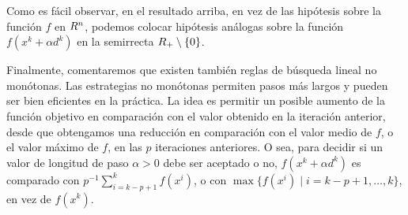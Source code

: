 Como es fácil observar, en el resultado arriba, en vez de las hipótesis sobre la función $f$ en $R^n$, podemos colocar hipótesis análogas sobre la función $f(x^k + \alpha d^k)$ en la semirrecta $R_+ \setminus \{0\}$.

Finalmente, comentaremos que existen también reglas de búsqueda lineal no monótonas. Las estrategias no monótonas permiten pasos más largos y pueden ser bien eficientes en la práctica. La idea es permitir un posible aumento de la función objetivo en comparación con el valor obtenido en la iteración anterior, desde que obtengamos una reducción en comparación con el valor medio de $f$, o el valor máximo de $f$, en las $p$ iteraciones anteriores. O sea, para decidir si un valor de longitud de paso $\alpha > 0$ debe ser aceptado o no, $f(x^k + \alpha d^k)$ es comparado con $p^{-1} \sum_{i=k-p+1}^k f(x^i)$, o con $\max \{ f(x^i) \mid i = k-p+1, \dots, k \}$, en vez de $f(x^k)$.

